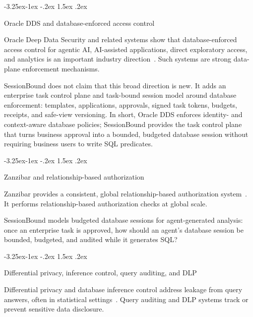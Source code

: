 \documentclass[10pt,twocolumn]{article}
\makeatletter
\newcounter{algorithm}
\renewcommand\subsection{\@startsection{subsection}{2}{\z@}%
  {-3.25ex\@plus -1ex \@minus -.2ex}%
  {1.5ex \@plus .2ex}%
  {\normalfont\large\bfseries\raggedright}}
\makeatother
\begin{document}
\hypertarget{oracle-dds-and-database-enforced-access-control}{%
\subsection{Oracle DDS and database-enforced access
control}\label{oracle-dds-and-database-enforced-access-control}}

Oracle Deep Data Security and related systems show that
database-enforced access control for agentic AI, AI-assisted
applications, direct exploratory access, and analytics is an important
industry direction~\cite{oracle2026deepdatasecuritydocs,oracle2026deepdatasecuritybrief}.
Such systems are strong data-plane enforcement mechanisms.

SessionBound does not claim that this broad direction is new. It adds an
enterprise task control plane and task-bound session model around
database enforcement: templates, applications, approvals, signed task
tokens, budgets, receipts, and safe-view versioning. In short, Oracle
DDS enforces identity- and context-aware database policies; SessionBound
provides the task control plane that turns business approval into a
bounded, budgeted database session without requiring business users to
write SQL predicates.

\hypertarget{zanzibar-and-relationship-based-authorization}{%
\subsection{Zanzibar and relationship-based
authorization}\label{zanzibar-and-relationship-based-authorization}}

Zanzibar provides a consistent, global relationship-based authorization
system~\cite{pang2019zanzibar}. It performs relationship-based
authorization checks at global scale.

SessionBound models budgeted database sessions for agent-generated
analysis: once an enterprise task is approved, how should an agent's
database session be bounded, budgeted, and audited while it generates
SQL?

\hypertarget{differential-privacy-inference-control-query-auditing-and-dlp}{%
\subsection{Differential privacy, inference control, query
auditing, and
DLP}\label{differential-privacy-inference-control-query-auditing-and-dlp}}

Differential privacy and database inference control address leakage from
query answers, often in statistical
settings~\cite{dwork2014algorithmic,adam1989securitycontrol}. Query
auditing and DLP systems track or prevent sensitive data disclosure.
\end{document}
